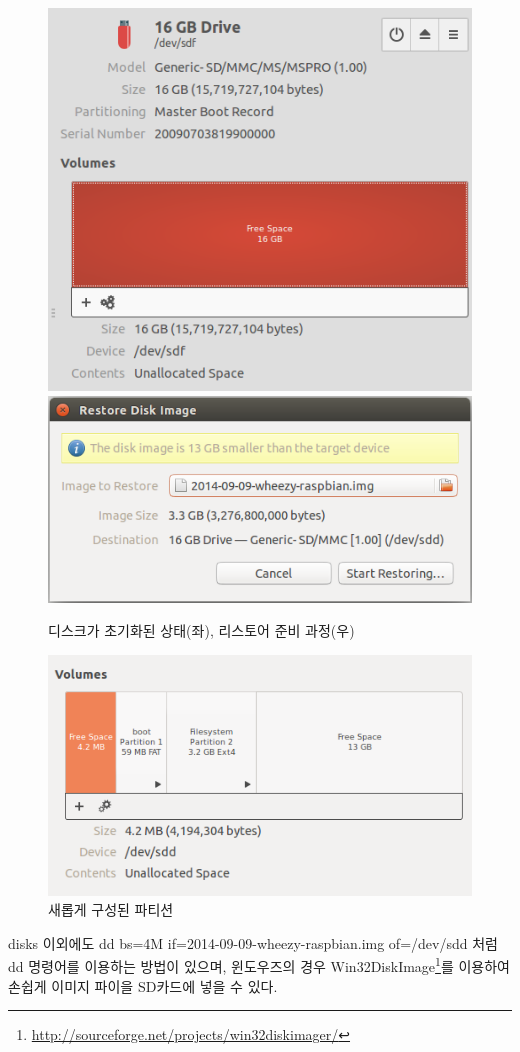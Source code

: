 \vspace{\baselineskip}
\begin{figure}[h]
\centering
\includegraphics[width=0.4\columnwidth]{pictures/chapter3/odroid_sd.png}
\includegraphics[width=0.5\columnwidth]{pictures/chapter3/raspberrypi_disks2.png}
\caption{디스크가 초기화된 상태(좌), 리스토어 준비 과정(우)}
\label{fig:raspbian_partition}
\end{figure}

\begin{figure}[h]
\centering\includegraphics[width=0.6\columnwidth]{pictures/chapter3/raspberrypi_disks3.png}
\caption{새롭게 구성된 파티션}
\label{fig:raspbian_partition_new}
\end{figure}

\newpage

\begin{exercise}
disks 이외에도 dd bs=4M if=2014-09-09-wheezy-raspbian.img of=/dev/sdd 처럼 dd 명령어를 이용하는 방법이 있으며, 윈도우즈의 경우 Win32DiskImage\footnote{\url{http://sourceforge.net/projects/win32diskimager/}}를 이용하여 손쉽게 이미지 파이을 SD카드에 넣을 수 있다.
\end{exercise}

